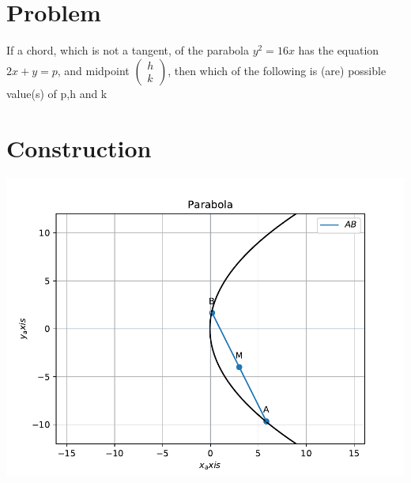 \documentclass[10pt, a4paper]{article}
\title{\mytitle}
\author{\myauthor\hspace{1em}\\\contact\\FWC22040\hspace{6.5em}IITH\hspace{0.5em}\mymodule\hspace{6em}ASSIGN-6}
\date{}
\newcommand{\myvec}[1]{\ensuremath{\begin{pmatrix}#1\end{pmatrix}}}
\begin{document}
 \maketitle
 \tableofcontents
 \section{Problem}
If a chord, which is not a tangent, of the parabola $y^2=16x$ has the equation $2x+y=p$, and midpoint $\myvec{h\\k}$, then which of the following is (are) possible value(s) of p,h and k
	\section{Construction}
\includegraphics[scale=0.5]{par.pdf}
\end{document}
